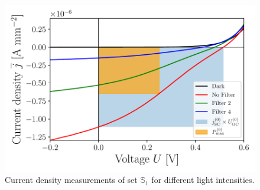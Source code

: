 \documentclass[a4paper,10pt,twocolumn]{article}
\begin{document}
\begin{extract*}
\begin{figure}[ht]\centering
	\includegraphics[width=\columnwidth]{../../../IV-Curve-Analysis/OSC2Graph.pdf}
	\caption{Current density measurements of set $\mathbb{S}_1$ for different light intensities.}
	\label{fig:OSC3Graph}
\end{figure}


\end{extract*}
\end{document}
